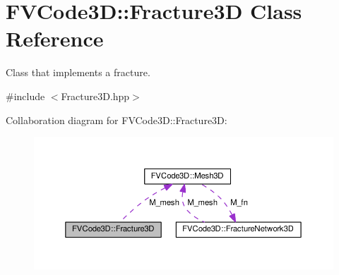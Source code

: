 \hypertarget{classFVCode3D_1_1Fracture3D}{}\section{F\+V\+Code3D\+:\+:Fracture3D Class Reference}
\label{classFVCode3D_1_1Fracture3D}


Class that implements a fracture.  




{\ttfamily \#include $<$Fracture3\+D.\+hpp$>$}



Collaboration diagram for F\+V\+Code3D\+:\+:Fracture3D\+:
\nopagebreak
\begin{figure}[H]
\begin{center}
\leavevmode
\includegraphics[width=350pt]{classFVCode3D_1_1Fracture3D__coll__graph}
\end{center}
\end{figure}
